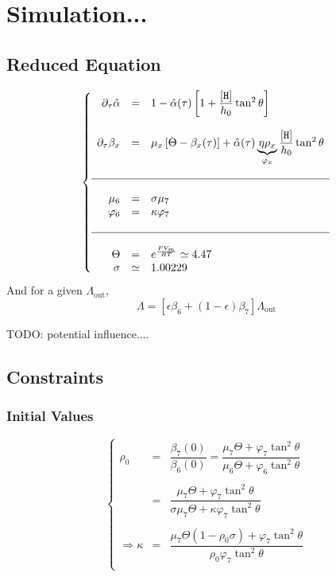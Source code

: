 \documentclass[aps,onecolumn,10pt]{revtex4}
\newcommand{\mychem}[1]{\mathtt{#1}}
\newcommand{\myconc}[1]{\left\lbrack{#1}\right\rbrack}
\newcommand{\spproton}{\mychem{H}}
\newcommand{\proton}{\myconc{\spproton}}
\newcommand{\LiAll}{\Lambda}
\newcommand{\LiAllOut}{{\LiAll}_{\mathrm{out}}}
\begin{document}
\section{Simulation...}

\subsection{Reduced Equation}
\begin{equation}
\left\lbrace
\begin{array}{rcl}
	\partial_\tau \hat\alpha & = & 1 - \hat\alpha(\tau) \left[ 1 + \dfrac{\proton}{h_0} \tan^2\theta\right]\\
	\\
	\partial_\tau \beta_x    & = & \mu_x\left[\Theta-\beta_x(\tau)\right] + \hat\alpha(\tau) \underbrace{\eta \rho_x}_{\varphi_x} \dfrac{\proton}{h_0} \tan^2\theta
	\\
	\\
	\hline
	\\
	\mu_6     & = & \sigma \mu_7\\
	\varphi_6 & = & \kappa \varphi_7\\
	\\
	\hline
	\\
	\Theta    & = & e^{\frac{FV_m}{RT}} \simeq 4.47\\
	\sigma    & \simeq & 1.00229 \\
\end{array}
\right.
\end{equation}
And for a given $\LiAllOut$,
\begin{equation}
	\LiAll = \left[ \epsilon \beta_6 + (1-\epsilon) \beta_7 \right] \LiAllOut
\end{equation}

TODO: potential influence....

\subsection{Constraints}
\subsubsection{Initial Values}
\begin{equation}
\left\lbrace
\begin{array}{rcl}
	\rho_0 & = &  \dfrac{\beta_7(0)}{\beta_6(0)} = \dfrac{\mu_7 \Theta + \varphi_7 \tan^2\theta}{\mu_6 \Theta + \varphi_6 \tan^2\theta} \\
		\\
		& = &  \dfrac{\mu_7 \Theta + \varphi_7 \tan^2\theta}{\sigma\mu_7 \Theta + \kappa\varphi_7 \tan^2\theta}\\
		\\
	\Rightarrow	\kappa & =  & \dfrac{\mu_7\Theta \left(1-\rho_0\sigma\right) + \varphi_7 \tan^2\theta}{\rho_0\varphi_7 \tan^2\theta} \\
\end{array}
\right.
\end{equation}
\end{document}
